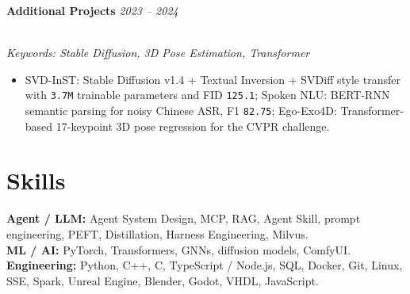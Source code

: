 \documentclass[a4paper,10pt]{extarticle}
\newcommand{\project}[2]{%
  \textbf{#1} \hfill \textit{#2}
}
\newcommand{\projectkeywords}[1]{%
  \\[-2pt]{\footnotesize\textit{Keywords: #1}}
}
\begin{document}
\project{Additional Projects}{2023 -- 2024}
\projectkeywords{Stable Diffusion, 3D Pose Estimation, Transformer}
\vspace{-0.85em}
{\small
\begin{itemize}
  \item SVD-InST: Stable Diffusion v1.4 + Textual Inversion + SVDiff style transfer with \texttt{3.7M} trainable parameters and FID \texttt{125.1}; Spoken NLU: BERT-RNN semantic parsing for noisy Chinese ASR, F1 \texttt{82.75}; Ego-Exo4D: Transformer-based 17-keypoint 3D pose regression for the CVPR challenge.
\end{itemize}
}

\section{Skills}
{\scriptsize
\textbf{Agent / LLM:} Agent System Design, MCP, RAG, Agent Skill, prompt engineering, PEFT, Distillation, Harness Engineering, Milvus.\\
\textbf{ML / AI:} PyTorch, Transformers, GNNs, diffusion models, ComfyUI.\\
\textbf{Engineering:} Python, C++, C, TypeScript / Node.js, SQL, Docker, Git, Linux, SSE, Spark, Unreal Engine, Blender, Godot, VHDL, JavaScript.
}
\end{document}

